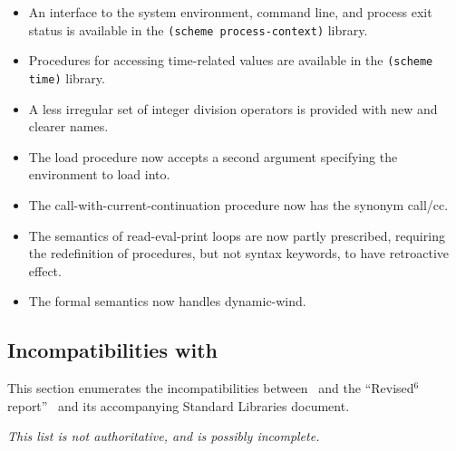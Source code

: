 \begin{itemize}
\item An interface to the system environment, command line, and process exit status is
available in the {\tt (scheme process-context)} library.

\item Procedures for accessing time-related values are available in the
{\tt (scheme time)} library.

\item A less irregular set of integer division operators is provided
with new and clearer names.

\item The {\cf load} procedure now accepts a second argument specifying the environment to
load into.

\item The {\cf call-with-current-continuation} procedure now has the synonym
{\cf call/cc}.

\item The semantics of read-eval-print loops are now partly prescribed,
requiring the redefinition of procedures, but not syntax keywords, to have retroactive effect.

\item The formal semantics now handles {\cf dynamic-wind}.
\end{itemize}

\subsection*{Incompatibilities with \rsixrs}
This section enumerates the incompatibilities between \rsevenrs~and
the ``Revised$^6$ report''~\cite{R6RS} and its accompanying Standard Libraries document.

{\em This list is not authoritative, and is possibly incomplete.}


